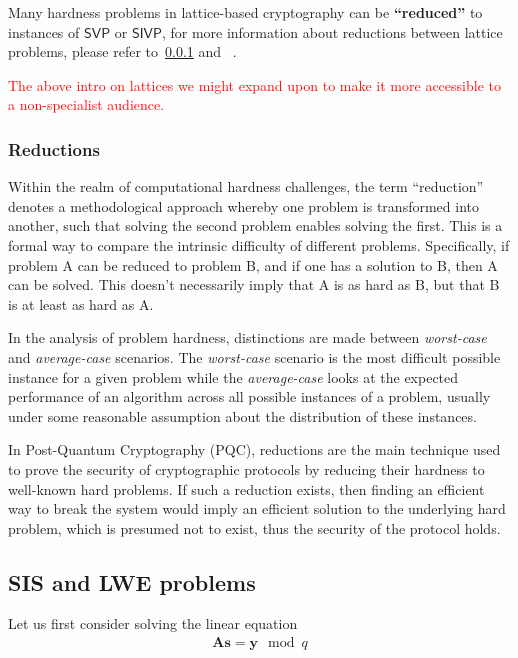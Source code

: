 \documentclass[cryptography,review,submit,pdftex,moreauthors,amsmath,amssymb,aps,strict]{Definitions/mdpi}
\newcommand{\peter}[1]{\textcolor{red}{#1}}
\begin{document}
\noindent Many hardness problems in lattice-based cryptography can be \textbf{``reduced''} to instances of $\mathsf{SVP}$ or $\mathsf{SIVP}$, for more information about reductions between lattice problems, please refer to~\ref{reduction} and ~\cite{reduction_lattice}.

\peter{The above intro on lattices we might expand upon to make it more accessible to a non-specialist audience.}

\subsubsection{Reductions}\label{reduction}

Within the realm of computational hardness challenges, the term ``reduction'' denotes a methodological approach whereby one problem is transformed into another, such that solving the second problem enables solving the first. This is a formal way to compare the intrinsic difficulty of different problems.  Specifically, if problem A can be reduced to problem B, and if one has a solution to B, then A can be solved. This doesn't necessarily imply that A is as hard as B, but that B is at least as hard as A. 

In the analysis of problem hardness, distinctions are made between \textit{worst-case} and \textit{average-case} scenarios. The \textit{worst-case} scenario is the most difficult possible instance for a given problem while the \textit{average-case} looks at the expected performance of an algorithm across all possible instances of a problem, usually under some reasonable assumption about the distribution of these instances. 

In Post-Quantum Cryptography (PQC), reductions are the main technique used to prove the security of cryptographic protocols by reducing their hardness to well-known hard problems. If such a reduction exists, then finding an efficient way to break the system would imply an efficient solution to the underlying hard problem, which is presumed not to exist, thus the security of the protocol holds.



\subsection{SIS and LWE problems}
Let us first consider solving the linear equation
\begin{align}
    \mathbf{A}\mathbf{s} = \mathbf{y}\mod q \label{eq:linear_equation}
\end{align}
\end{document}
